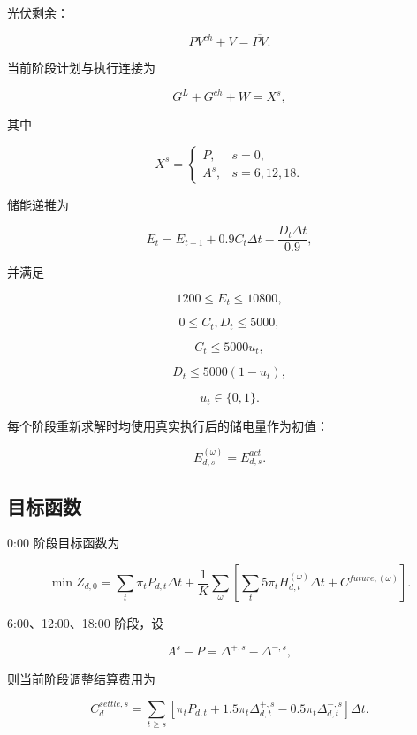 光伏剩余：

\begin{equation}
PV^{ch}+V=\overline{PV}.
\end{equation}

当前阶段计划与执行连接为

\begin{equation}
G^L+G^{ch}+W=X^s,
\end{equation}

其中

\[
X^s=
\begin{cases}
P,&s=0,\\
A^s,&s=6,12,18.
\end{cases}
\]

储能递推为

\begin{equation}
E_t
=
E_{t-1}
+
0.9C_t\Delta t
-
\frac{D_t\Delta t}{0.9},
\end{equation}

并满足

\[
1200\le E_t\le10800,
\]

\[
0\le C_t,D_t\le5000,
\]

\[
C_t\le5000u_t,
\]

\[
D_t\le5000(1-u_t),
\]

\begin{equation}
u_t\in\{0,1\}.
\end{equation}

每个阶段重新求解时均使用真实执行后的储电量作为初值：

\begin{equation}
E^{(\omega)}_{d,s}
=
E^{act}_{d,s}.
\end{equation}

\subsection{目标函数}

0:00 阶段目标函数为

\begin{equation}
\min Z_{d,0}
=
\sum_t
\pi_tP_{d,t}\Delta t
+
\frac1K
\sum_{\omega}
\left[
\sum_t
5\pi_tH^{(\omega)}_{d,t}\Delta t
+
C^{future,(\omega)}
\right].
\end{equation}

6:00、12:00、18:00 阶段，设

\[
A^s-P
=
\Delta^{+,s}
-
\Delta^{-,s},
\]

则当前阶段调整结算费用为

\begin{equation}
C^{settle,s}_d
=
\sum_{t\ge s}
\left[
\pi_tP_{d,t}
+
1.5\pi_t\Delta^{+,s}_{d,t}
-
0.5\pi_t\Delta^{-,s}_{d,t}
\right]\Delta t.
\end{equation}

